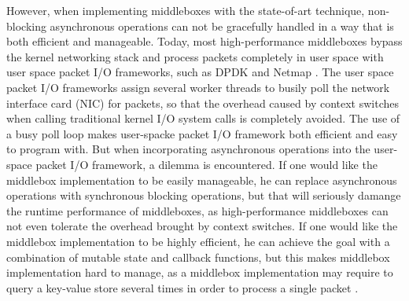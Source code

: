 However, when implementing middleboxes with the state-of-art technique, non-blocking asynchronous operations can not be gracefully handled in a way that is both efficient and manageable. Today, most high-performance middleboxes bypass the kernel networking stack and process packets completely in user space with user space packet I/O frameworks, such as DPDK \cite{} and Netmap \cite{}. The user space packet I/O frameworks assign several worker threads to busily poll the network interface card (NIC) for packets, so that the overhead caused by context switches when calling traditional kernel I/O system calls is completely avoided. The use of a busy poll loop makes user-spacke packet I/O framework both efficient and easy to program with. But when incorporating asynchronous operations into the user-space packet I/O framework, a dilemma is encountered. If one would like the middlebox implementation to be easily manageable, he can replace asynchronous operations with synchronous blocking operations, but that will seriously damange the runtime performance of middleboxes, as high-performance middleboxes can not even tolerate the overhead brought by context switches. If one would like the middlebox implementation to be highly efficient, he can achieve the goal with a combination of mutable state and callback functions, but this makes middlebox implementation hard to manage, as a middlebox implementation may require to query a key-value store several times in order to process a single packet \cite{}.





